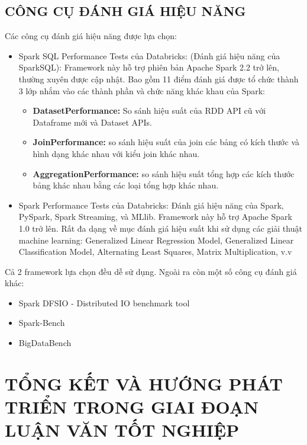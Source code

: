 \documentclass[11pt,a4paper]{article}
\begin{document}
\subsection{CÔNG CỤ ĐÁNH GIÁ HIỆU NĂNG}
Các công cụ đánh giá hiệu năng được lựa chọn:
\begin{itemize}
    \item Spark SQL Performance Tests của Databricks\cite{test_sql}: (Đánh giá hiệu năng của SparkSQL): Framework này hỗ trợ phiên bản Apache Spark 2.2 trở lên, thường xuyên được cập nhật. Bao gồm 11 điểm đánh giá được tổ chức thành 3 lớp nhắm vào các thành phần và chức năng khác khau của Spark:
    \begin{itemize}
        \item \textbf{DatasetPerformance: } So sánh hiệu suất của RDD API cũ với Dataframe mới và Dataset APIs.
        \item \textbf{JoinPerformance: } so sánh hiệu suất của join các bảng có kích thước và hình dạng khác nhau với kiểu join khác nhau.
        \item \textbf{AggregationPerformance: } so sánh hiệu suất tổng hợp các kích thước bảng khác nhau bằng các loại tổng hợp khác nhau.
    \end{itemize}
    \item Spark Performance Tests của Databricks\cite{test_spark}: Đánh giá hiệu năng của Spark, PySpark, Spark Streaming, và MLlib. Framework này hỗ trợ Apache Spark 1.0 trở lên. Rất đa dạng về mục đánh giá hiệu suất khi sử dụng các giải thuật machine learning: Generalized Linear Regression Model, Generalized Linear Classification Model, Alternating Least Squares, Matrix Multiplication, v.v
\end{itemize}
Cả 2 framework lựa chọn đều dễ sử dụng. Ngoài ra còn một số công cụ đánh giá khác: 
\begin{itemize}
    \item Spark DFSIO - Distributed IO benchmark tool\cite{spark_benchmarks}
    \item Spark-Bench\cite{spark_bench}
    \item BigDataBench
\end{itemize}


\newpage
\section{TỔNG KẾT VÀ HƯỚNG PHÁT TRIỂN TRONG GIAI ĐOẠN LUẬN VĂN TỐT NGHIỆP}
\end{document}
